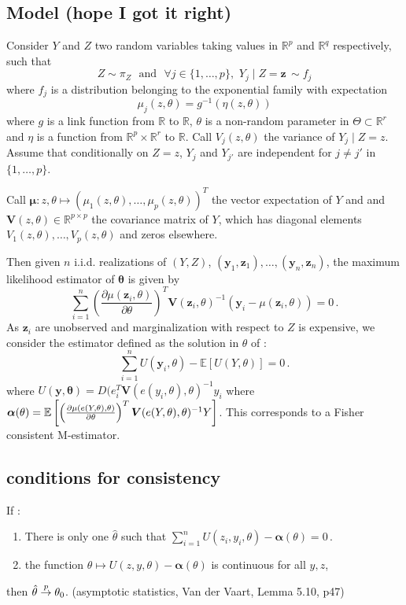 \documentclass[twoside,11pt]{article}
\newcommand{\R}{\mathbb{R}}
\begin{document}
\subsection*{Model (hope I got it right)}
Consider $Y$ and $Z$ two random variables taking values in $\R^p$ and $\R^q$ respectively, such that
$$Z\sim \pi_Z\,\,\text{ and }\,\,\forall j \in \{1, \ldots, p\}, \,\, Y_j \mid Z = \boldsymbol{z} \, \sim f_j$$
where $f_j$ is a distribution belonging to the exponential family with expectation 
$$ \mu_j(z, \theta) = g^{-1}(\eta(z, \theta))$$
where $g$ is a link function from $\R$ to $\R$, $\theta$ is a non-random parameter in $\Theta \subset \R ^r$ and $\eta$ is a function from $\R^p \times \R^r$ to $\R$. Call  $V_j(z, \theta)$ the variance of $Y_j \mid Z = z$.  
Assume that conditionally on $Z = z$, $Y_j$ and $Y_{j'}$ are independent for $j \neq j'$ in $\{1, \ldots, p\}$.

Call  $\boldsymbol{\mu} : z, \theta \mapsto \left(\mu_1(z, \theta), \ldots, \mu_p(z, \theta)\right)^T$ the vector expectation of $Y$ and 
and $\boldsymbol{V}(z, \theta) \in \R^{p \times p}$ the covariance matrix of $Y$, which has diagonal elements $V_1(z, \theta), \ldots, V_p(z, \theta)$ and zeros elsewhere. 

Then given $n$ i.i.d. realizations of $(Y, Z)$, $(\boldsymbol{y}_1, \boldsymbol{z}_1), \ldots, (\boldsymbol{y}_n, \boldsymbol{z}_n)$, the maximum likelihood estimator of $\boldsymbol{\theta}$ is given by
$$ \sum_{i = 1} ^ n \left(\frac{\partial \mu(\boldsymbol{z}_i, \theta)}{\partial \theta}\right)^T\boldsymbol{V}(\boldsymbol{z}_i, \theta)^{-1} \left(\boldsymbol{y}_i - \mu(\boldsymbol{z}_i, \theta)\right) = 0 \, . $$
As $\boldsymbol{z}_i$ are unobserved and marginalization with respect to $Z$ is expensive, we consider the estimator defined as the solution in $\theta$ of :
$$
\sum_{i = 1} ^ n U(\boldsymbol{y}_i, \theta) - \mathbb{E}\left[U(Y, \theta) \right] \boldsymbol = 0 \, .
$$
where $U(\boldsymbol{y}, \boldsymbol{\theta}) = D(e_i ^T\boldsymbol{V}(e(y_i, \theta), \theta)^{-1} y_i$
where $\boldsymbol{\alpha}(\theta) = \mathbb{E}\left[
\left(\frac{\partial \mu(e(Y, \theta), \theta)}{\partial \theta}\right)^T\boldsymbol{V}(e(Y, \theta), \theta)^{-1} Y
\right]$.
This corresponds to a Fisher consistent M-estimator.


\subsection*{conditions for consistency}

If : 
\begin{enumerate}
    \item There is only one $\hat\theta$ such that $
\sum_{i = 1} ^ n U(z_i, y_i, \theta) - \boldsymbol{\alpha}(\theta) = 0 \, .
$\item the function $\theta \mapsto  U(z, y, \theta) - \boldsymbol{\alpha}(\theta)$ is continuous for all $y, z$,
\end{enumerate}
 then $\hat\theta \overset{p}{\rightarrow} \theta_0$. (asymptotic statistics, Van der Vaart, Lemma 5.10, p47)
 
\end{document}
